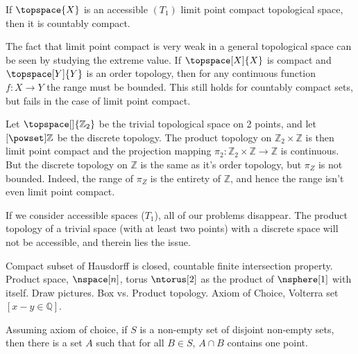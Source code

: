 \documentclass{book}                                                           %
\begin{document}
            \begin{theorem}
                If $\topspace{X}$ is an accessible $(T_{1})$ limit point compact
                topological space, then it is countably compact.
            \end{theorem}
            The fact that limit point compact is very weak in a general topological
            space can be seen by studying the extreme value. If
            $\topspace[X]{X}$ is compact and $\topspace[Y]{Y}$ is an order topology,
            then for any continuous function $f:X\rightarrow{Y}$ the range must be
            bounded. This still holds for countably compact sets, but fails in the
            case of limit point compact.
            \begin{example}
                Let $\topspace[\empty]{\mathbb{Z}_{2}}$ be the trivial topological
                space on 2 points, and let $\mathcal[\powset]{\mathbb{Z}}$ be the
                discrete topology. The product topology on
                $\mathbb{Z}_{2}\times\mathbb{Z}$ is then limit point compact and the
                projection mapping
                $\pi_{2}:\mathbb{Z}_{2}\times\mathbb{Z}\rightarrow\mathbb{Z}$ is
                continuous. But the discrete topology on $\mathbb{Z}$ is the same as
                it's order topology, but $\pi_{Z}$ is not bounded. Indeed, the range
                of $\pi_{Z}$ is the entirety of $\mathbb{Z}$, and hence the range
                isn't even limit point compact.
            \end{example}
            If we consider accessible spaces ($T_{1}$), all of our problems
            disappear. The product topology of a trivial space (with at least two
            points) with a discrete space will not be accessible, and therein lies
            the issue.
            \par\hfill\par
            Compact subset of Hausdorff is closed, countable finite intersection
            property. Product space, $\nspace[n]$, torus $\ntorus[2]$ as the product
            of $\nsphere[1]$ with itself. Draw pictures. Box vs. Product topology.
            Axiom of Choice, Volterra set $[x-y\in\mathbb{Q}]$.
            \begin{theorem}
                Assuming axiom of choice, if $S$ is a non-empty set of disjoint
                non-empty sets, then there is a set $A$ such that for all
                $B\in{S}$, $A\cap{B}$ contains one point.
            \end{theorem}
\end{document}
